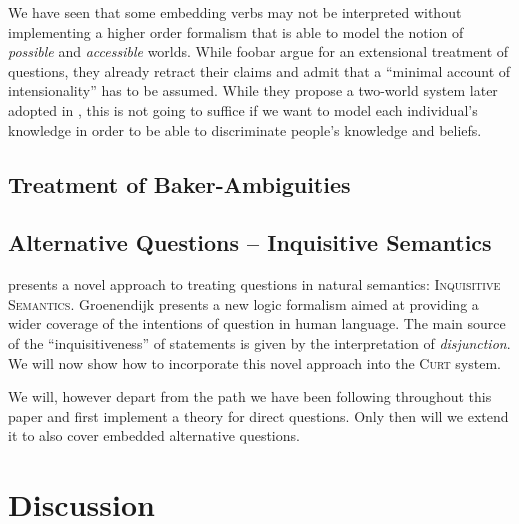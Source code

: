 \documentclass{scrartcl}
\newcommand{\pn}{\textsc}
\begin{document}
We have seen that some embedding verbs may not be interpreted without
implementing a higher order formalism that is able to model the notion of
\emph{possible} and \emph{accessible} worlds. While foobar %
argue for an extensional treatment of questions, they already %
retract their claims and admit that a ``minimal account of intensionality'' has
to be assumed. While they propose a two-world system later adopted in
\cite{g:is}, this is not going to suffice if we want to model each individual's
knowledge in order to be able to discriminate people's knowledge and beliefs.

\subsection{Treatment of Baker-Ambiguities}

\subsection{Alternative Questions -- Inquisitive Semantics}

\cite{g:is} presents a novel approach to treating questions in natural
semantics: \pn{Inquisitive Semantics}. Groenendijk presents a new logic
formalism aimed at providing a wider coverage of the intentions of question in
human language. The main source of the ``inquisitiveness'' of statements is
given by the interpretation of \emph{disjunction}. We will now show how to
incorporate this novel approach into the \pn{Curt} system.

We will, however depart from the path we have been following throughout this
paper and first implement a theory for direct questions. Only then will we extend
it to also cover embedded alternative questions.

\section{Discussion}


\end{document}
